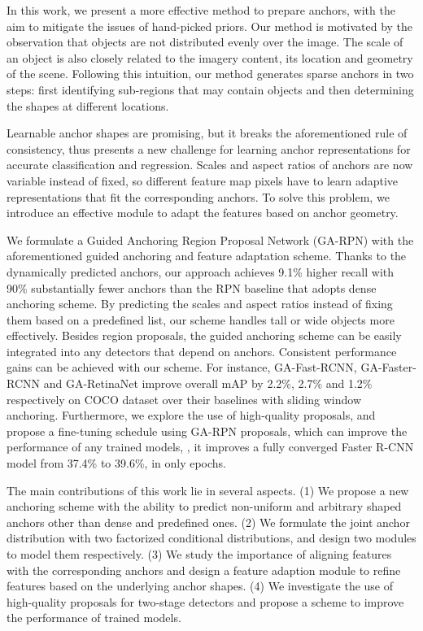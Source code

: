 \documentclass[10pt,twocolumn,letterpaper]{article}
\newcommand{\algname}{GA-RPN}
\begin{document}
In this work, we present a more effective method to prepare anchors,
with the aim to mitigate the issues of hand-picked priors.
Our method is motivated by the observation that objects are not distributed
evenly over the image.
The scale of an object is also closely related to the imagery content,
its location and geometry of the scene.
Following this intuition, our method generates sparse anchors in two steps:
first identifying sub-regions that may contain objects and then
determining the shapes at different locations.

Learnable anchor shapes are promising, but it breaks the aforementioned rule of consistency, thus presents a new challenge for learning anchor representations for accurate classification and regression.
Scales and aspect ratios of anchors are now variable instead of fixed,
so different feature map pixels have to learn adaptive representations that
fit the corresponding anchors.
To solve this problem, we introduce an effective module to adapt
the features based on anchor geometry.

We formulate a Guided Anchoring Region Proposal Network (\algname) with the
aforementioned guided anchoring and feature adaptation scheme.
Thanks to the dynamically predicted anchors, our approach achieves 9.1\%
higher recall with 90\% substantially fewer anchors than the RPN baseline
that adopts dense anchoring scheme.
By predicting the scales and aspect ratios instead of fixing them based on
a predefined list, our scheme handles tall or wide objects more effectively.
Besides region proposals, the guided anchoring scheme can be easily integrated
into any detectors that depend on anchors. Consistent performance gains can be achieved with our scheme.
For instance, GA-Fast-RCNN, GA-Faster-RCNN and GA-RetinaNet improve overall mAP by 2.2\%, 2.7\% and 1.2\%
respectively on COCO dataset over their baselines with sliding window anchoring.
Furthermore, we explore the use of high-quality proposals, and propose
a fine-tuning schedule using GA-RPN proposals, which can improve the performance
of any trained models, \eg, it improves a fully converged Faster R-CNN model
from 37.4\% to 39.6\%, in only  epochs.

The main contributions of this work lie in several aspects.
(1) We propose a new anchoring scheme with the ability to predict non-uniform and
arbitrary shaped anchors other than dense and predefined ones.
(2) We formulate the joint anchor distribution with two factorized conditional
distributions, and design two modules to model them respectively.
(3) We study the importance of aligning features with the corresponding anchors
and design a feature adaption module to refine features based on the underlying
anchor shapes.
(4) We investigate the use of high-quality proposals for two-stage detectors
and propose a scheme to improve the performance of trained models. 
\end{document}

